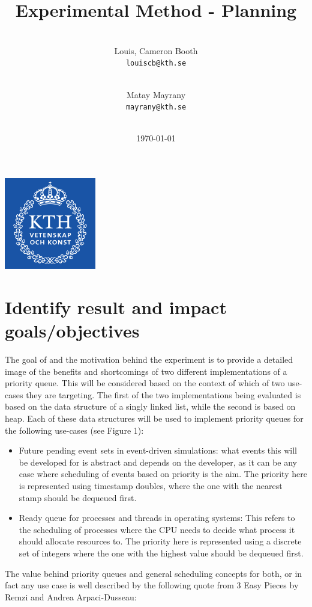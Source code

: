 \documentclass[12pt]{article}
\title{Experimental Method - Planning}
\author{
\\
  Louis, Cameron Booth\\
  \texttt{louiscb@kth.se}
  \and
  \\
  Matay Mayrany\\
  \texttt{mayrany@kth.se}
  \\
  \\
}
\date{\today}
\begin{document}
\maketitle

\begin{center}
\includegraphics[width=4cm]{logo.png}
\end{center}

\pagebreak
\tableofcontents
\newpage
\section{Identify result and impact goals/objectives}

The goal of and the motivation behind the experiment is to provide a detailed image of the benefits and shortcomings of two different implementations of a priority queue. This will be considered based on the context of which of two use-cases they are targeting. The first of the two implementations being evaluated is based on the data structure of a singly linked list, while the second is based on heap. 
Each of these data structures will be used to implement priority queues for the following use-cases (see Figure 1): 

\begin{itemize}
   \item Future pending event sets in event-driven simulations: what events this will be developed for is abstract and depends on the developer, as it can be any case where scheduling of events based on priority is the aim. The priority here is represented using timestamp doubles, where the one with the nearest stamp should be dequeued first.
   \item Ready queue for processes and threads in operating systems:
This refers to the scheduling of processes where the CPU needs to decide what process it should allocate resources to. The priority here is represented using a discrete set of integers where the one with the highest value should be dequeued first. 
\end{itemize}

The value behind priority queues and general scheduling concepts for both, or in fact any use case is well described by the following quote from 3 Easy Pieces by Remzi and Andrea Arpaci-Dusseau:
\end{document}
